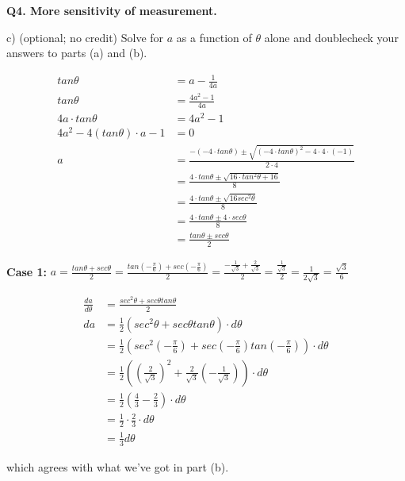 \documentclass[9pt]{article}
\begin{document}
\begin{tcolorbox}
  \textbf{Q4. More sensitivity of measurement.}

  c) (optional; no credit) Solve for $a$ as a function of $\theta$ alone and doublecheck your answers to parts (a) and (b).
\end{tcolorbox}

\begin{align*}
  tan \theta &= a - \frac{1}{4a} \\
  tan \theta &= \frac{4a^2 - 1}{4a} \\
  4a \cdot tan \theta &= 4a^2 - 1 \\
  4a^2 - 4 (tan \theta) \cdot a - 1 &= 0 \\
  a &= \frac{-(-4 \cdot tan \theta) \pm \sqrt{(-4 \cdot tan \theta)^2 - 4 \cdot 4 \cdot (-1)}}{2 \cdot 4} \\
    &= \frac{4 \cdot tan \theta \pm \sqrt{16 \cdot tan^2 \theta + 16}}{8} \\
    &= \frac{4 \cdot tan \theta \pm \sqrt{16 sec^2 \theta}}{8} \\
    &= \frac{4 \cdot tan \theta \pm 4 \cdot sec \theta}{8} \\
    &= \frac{tan \theta \pm sec \theta}{2}
\end{align*}

\textbf{Case 1:} $a = \frac{tan \theta + sec \theta}{2} = \frac{tan (-\frac{\pi}{6}) + sec (-\frac{\pi}{6})}{2} = \frac{-\frac{1}{\sqrt{3}} + \frac{2}{\sqrt{3}}}{2} = \frac{\frac{1}{\sqrt{3}}}{2} = \frac{1}{2 \sqrt{3}} = \frac{\sqrt{3}}{6}$

\begin{align*}
  \frac{da}{d \theta} &= \frac{sec^2 \theta + sec \theta tan \theta}{2} \\
  da &= \frac{1}{2} (sec^2 \theta + sec \theta tan \theta) \cdot d \theta \\
     &= \frac{1}{2} (sec^2 (-\frac{\pi}{6}) + sec(-\frac{\pi}{6}) tan(-\frac{\pi}{6})) \cdot d \theta \\
     &= \frac{1}{2} ((\frac{2}{\sqrt{3}})^2 + \frac{2}{\sqrt{3}}(-\frac{1}{\sqrt{3}})) \cdot d \theta \\
     &= \frac{1}{2} (\frac{4}{3} - \frac{2}{3}) \cdot d \theta \\
     &= \frac{1}{2} \cdot \frac{2}{3} \cdot d \theta \\
     &= \frac{1}{3} d \theta
\end{align*}

which agrees with what we've got in part (b).
\end{document}
